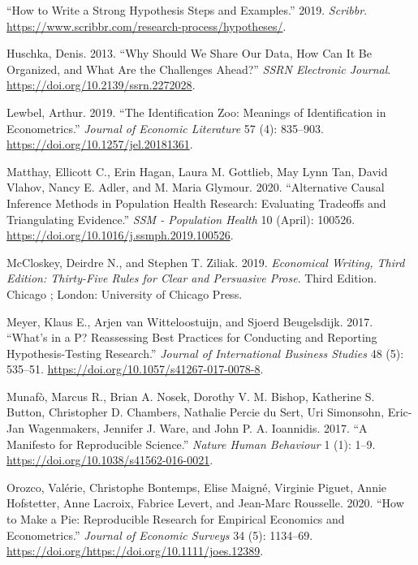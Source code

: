 \documentclass[
]{book}
\begin{document}
\leavevmode\hypertarget{ref-noauthor_how_2019}{}%
``How to Write a Strong Hypothesis Steps and Examples.'' 2019.
\emph{Scribbr}.
\url{https://www.scribbr.com/research-process/hypotheses/}.

\leavevmode\hypertarget{ref-huschka_why_2013}{}%
Huschka, Denis. 2013. ``Why Should We Share Our Data, How Can It Be
Organized, and What Are the Challenges Ahead?'' \emph{SSRN Electronic
Journal}. \url{https://doi.org/10.2139/ssrn.2272028}.

\leavevmode\hypertarget{ref-lewbel_identification_2019}{}%
Lewbel, Arthur. 2019. ``The Identification Zoo: Meanings of
Identification in Econometrics.'' \emph{Journal of Economic Literature}
57 (4): 835--903. \url{https://doi.org/10.1257/jel.20181361}.

\leavevmode\hypertarget{ref-matthay_alternative_2020}{}%
Matthay, Ellicott C., Erin Hagan, Laura M. Gottlieb, May Lynn Tan, David
Vlahov, Nancy E. Adler, and M. Maria Glymour. 2020. ``Alternative Causal
Inference Methods in Population Health Research: Evaluating Tradeoffs
and Triangulating Evidence.'' \emph{SSM - Population Health} 10 (April):
100526. \url{https://doi.org/10.1016/j.ssmph.2019.100526}.

\leavevmode\hypertarget{ref-mccloskey_economical_2019}{}%
McCloskey, Deirdre N., and Stephen T. Ziliak. 2019. \emph{Economical
Writing, Third Edition: Thirty-Five Rules for Clear and Persuasive
Prose}. Third Edition. Chicago ; London: University of Chicago Press.

\leavevmode\hypertarget{ref-meyer_whats_2017}{}%
Meyer, Klaus E., Arjen van Witteloostuijn, and Sjoerd Beugelsdijk. 2017.
``What's in a P? Reassessing Best Practices for Conducting and Reporting
Hypothesis-Testing Research.'' \emph{Journal of International Business
Studies} 48 (5): 535--51.
\url{https://doi.org/10.1057/s41267-017-0078-8}.

\leavevmode\hypertarget{ref-munafo_manifesto_2017}{}%
Munafò, Marcus R., Brian A. Nosek, Dorothy V. M. Bishop, Katherine S.
Button, Christopher D. Chambers, Nathalie Percie du Sert, Uri Simonsohn,
Eric-Jan Wagenmakers, Jennifer J. Ware, and John P. A. Ioannidis. 2017.
``A Manifesto for Reproducible Science.'' \emph{Nature Human Behaviour}
1 (1): 1--9. \url{https://doi.org/10.1038/s41562-016-0021}.

\leavevmode\hypertarget{ref-orozco_how_2020}{}%
Orozco, Valérie, Christophe Bontemps, Elise Maigné, Virginie Piguet,
Annie Hofstetter, Anne Lacroix, Fabrice Levert, and Jean-Marc Rousselle.
2020. ``How to Make a Pie: Reproducible Research for Empirical Economics
and Econometrics.'' \emph{Journal of Economic Surveys} 34 (5): 1134--69.
\url{https://doi.org/https://doi.org/10.1111/joes.12389}.
\end{document}
